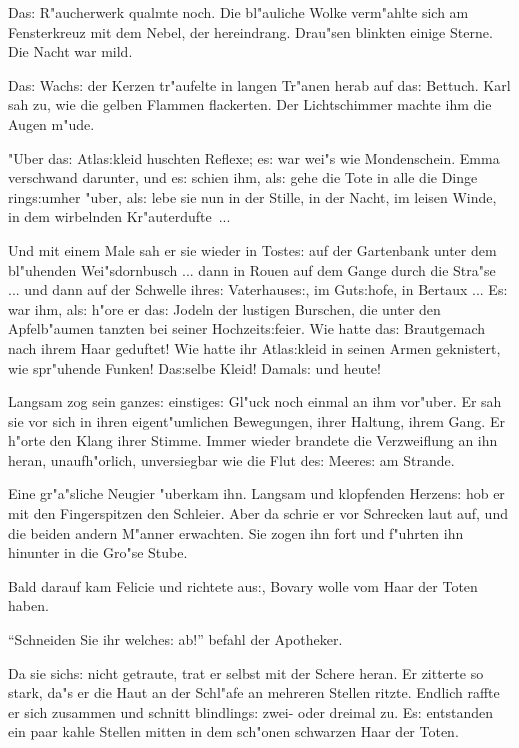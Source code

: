 \documentclass[oneside,12pt]{book}
\newcommand{\s}{s:}%
\begin{document}
Da{\s} R"aucherwerk qualmte noch. Die bl"auliche Wolke verm"ahlte
sich am Fensterkreuz mit dem Nebel, der hereindrang. Drau"sen
blinkten einige Sterne. Die Nacht war mild.

Da{\s} Wach{\s} der Kerzen tr"aufelte in langen Tr"anen herab auf
da{\s} Bettuch. Karl sah zu, wie die gelben Flammen flackerten.
Der Lichtschimmer machte ihm die Augen m"ude.

"Uber da{\s} Atla{\s}kleid huschten Reflexe; e{\s} war wei"s wie
Mondenschein. Emma verschwand darunter, und e{\s} schien ihm,
al{\s} gehe die Tote in alle die Dinge ring{\s}umher "uber, al{\s}
lebe sie nun in der Stille, in der Nacht, im leisen Winde, in dem
wirbelnden Kr"auterdufte~...

Und mit einem Male sah er sie wieder in Toste{\s} auf der
Gartenbank unter dem bl"uhenden Wei"sdornbusch ... dann in Rouen
auf dem Gange durch die Stra"se ... und dann auf der Schwelle
ihre{\s} Vaterhause{\s}, im Gut{\s}hofe, in Bertaux ... E{\s} war
ihm, al{\s} h"ore er da{\s} Jodeln der lustigen Burschen, die
unter den Apfelb"aumen tanzten bei seiner Hochzeit{\s}feier. Wie
hatte da{\s} Brautgemach nach ihrem Haar geduftet! Wie hatte ihr
Atla{\s}kleid in seinen Armen geknistert, wie spr"uhende Funken!
Da{\s}selbe Kleid! Damal{\s} und heute!

Langsam zog sein ganze{\s} einstige{\s} Gl"uck noch einmal an ihm
vor"uber. Er sah sie vor sich in ihren eigent"umlichen Bewegungen,
ihrer Haltung, ihrem Gang. Er h"orte den Klang ihrer Stimme. Immer
wieder brandete die Verzweiflung an ihn heran, unaufh"orlich,
unversiegbar wie die Flut de{\s} Meere{\s} am Strande.

Eine gr"a"sliche Neugier "uberkam ihn. Langsam und klopfenden
Herzen{\s} hob er mit den Fingerspitzen den Schleier. Aber da
schrie er vor Schrecken laut auf, und die beiden andern M"anner
erwachten. Sie zogen ihn fort und f"uhrten ihn hinunter in die
Gro"se Stube.

Bald darauf kam Felicie und richtete au{\s}, Bovary wolle vom Haar
der Toten haben.

"`Schneiden Sie ihr welche{\s} ab!"' befahl der Apotheker.

Da sie sich{\s} nicht getraute, trat er selbst mit der Schere
heran. Er zitterte so stark, da"s er die Haut an der Schl"afe an
mehreren Stellen ritzte. Endlich raffte er sich zusammen und
schnitt blindling{\s} zwei- oder dreimal zu. E{\s} entstanden ein
paar kahle Stellen mitten in dem sch"onen schwarzen Haar der
Toten.
\end{document}
